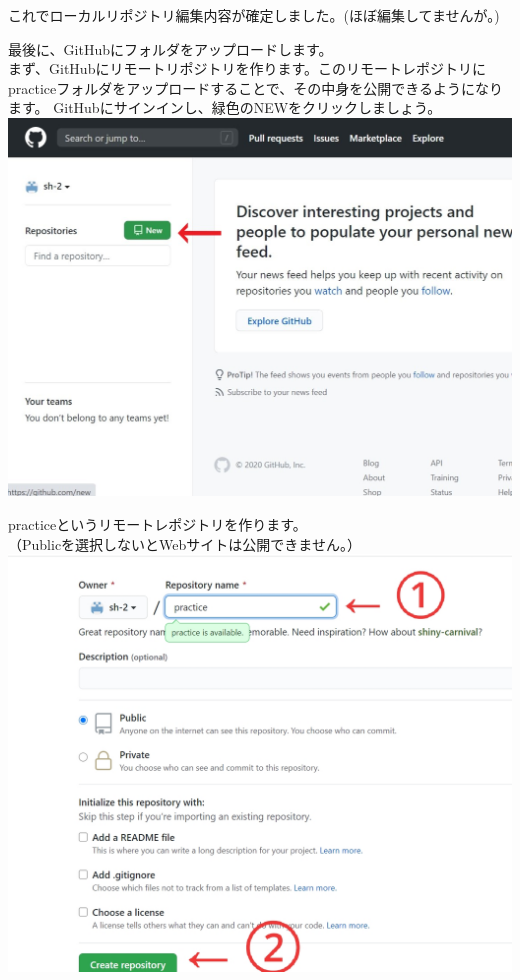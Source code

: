 \documentclass[
]{book}
\begin{document}
これでローカルリポジトリ編集内容が確定しました。(ほぼ編集してませんが。)

最後に、GitHubにフォルダをアップロードします。\\
まず、GitHubにリモートリポジトリを作ります。このリモートレポジトリにpracticeフォルダをアップロードすることで、その中身を公開できるようになります。
GitHubにサインインし、緑色のNEWをクリックしましょう。
\includegraphics{pics/new_repo.jpg}

practiceというリモートレポジトリを作ります。\\
（Publicを選択しないとWebサイトは公開できません。）
\includegraphics{pics/new_repo2.jpg}
\end{document}
